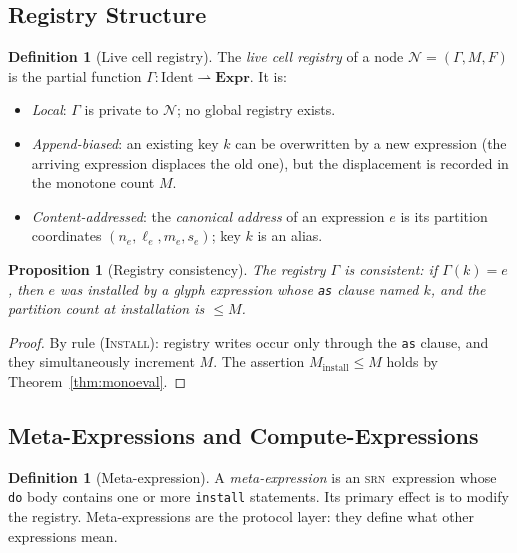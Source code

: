 \documentclass[twocolumn,11pt,a4paper]{article}
\newtheorem{proposition}[theorem]{Proposition}
\theoremstyle{definition}
\newtheorem{definition}[theorem]{Definition}
\theoremstyle{remark}
\newcommand{\srn}{\textsc{srn}}
\newcommand{\Node}{\mathcal{N}}
\newcommand{\Reg}{\Gamma}
\newcommand{\Expr}{\mathbf{Expr}}
\begin{document}
\subsection{Registry Structure}

\begin{definition}[Live cell registry]
\label{def:registry}
The \emph{live cell registry} of a node $\Node = (\Reg, M, F)$ is the
partial function $\Reg : \mathrm{Ident} \rightharpoonup \Expr$.  It is:
\begin{itemize}[noitemsep,topsep=2pt]
\item \emph{Local}: $\Reg$ is private to $\Node$; no global registry exists.
\item \emph{Append-biased}: an existing key $k$ can be overwritten by a
  new expression (the arriving expression displaces the old one), but
  the displacement is recorded in the monotone count $M$.
\item \emph{Content-addressed}: the \emph{canonical address} of an
  expression $e$ is its partition coordinates $(n_e, \ell_e, m_e, s_e)$;
  key $k$ is an alias.
\end{itemize}
\end{definition}

\begin{proposition}[Registry consistency]
\label{prop:regconsist}
The registry $\Reg$ is consistent: if $\Reg(k) = e$, then $e$ was
installed by a glyph expression whose \texttt{as} clause named $k$, and
the partition count at installation is $\leq M$.
\end{proposition}
\begin{proof}
By rule \textsc{(Install)}: registry writes occur only through the
\texttt{as} clause, and they simultaneously increment $M$.  The
assertion $M_{\mathrm{install}} \leq M$ holds by
Theorem~\ref{thm:monoeval}.
\end{proof}

\subsection{Meta-Expressions and Compute-Expressions}

\begin{definition}[Meta-expression]
A \emph{meta-expression} is an \srn\ expression whose \texttt{do} body
contains one or more \texttt{install} statements.  Its primary effect is
to modify the registry.  Meta-expressions are the protocol layer: they
define what other expressions mean.
\end{definition}
\end{document}

